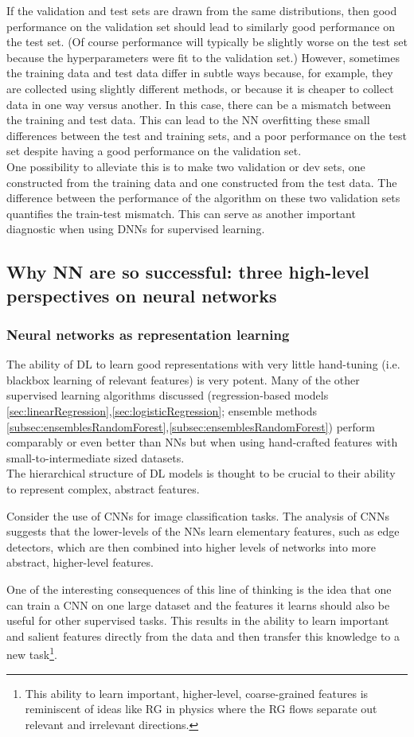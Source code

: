 If the validation and test sets are drawn from the same distributions, then good performance on the validation set should lead to similarly good performance on the test set. (Of course performance will typically be slightly worse on the test set because the hyperparameters were fit to the validation set.) However, sometimes the training data and test data differ in subtle ways because, for example, they are collected using slightly different methods, or because it is cheaper to collect data in one way versus another. In this case, there can be a mismatch between the training and test data. This can lead to the NN overfitting these small differences between the test and training sets, and a poor performance on the test set despite having a good performance on the validation set.
\\
One possibility to alleviate this is to make two validation or dev sets, one constructed from the training data and one constructed from the test data. The difference between the performance of the algorithm on these two validation sets quantifies the train-test mismatch. This can serve as another important diagnostic when using DNNs for supervised learning.

\subsection{Why NN are so successful: three high-level perspectives on neural networks}
\label{subsec:dnn2Successful}
\subsubsection{Neural networks as representation learning}
\label{subsubsec:dnn2SuccessfulRepresentation}
The ability of DL to learn good representations with very little hand-tuning (i.e. blackbox learning of relevant features) is very potent. Many of the other supervised learning algorithms discussed (regression-based models \ref{sec:linearRegression},\ref{sec:logisticRegression}; ensemble methods \ref{subsec:ensemblesRandomForest},\ref{subsec:ensemblesRandomForest}) perform comparably or even better than NNs but when using hand-crafted features with small-to-intermediate sized datasets.\\
The hierarchical structure of DL models is thought to be crucial to their ability to represent complex, abstract features.
\begin{example}
	Consider the use of CNNs for image classification tasks. The analysis of CNNs suggests that the lower-levels of the NNs learn elementary features, such as edge detectors, which are then combined into higher levels of networks into more abstract, higher-level features.
\end{example}
One of the interesting consequences of this line of thinking is the idea that one can train a CNN on one large dataset and the features it learns should also be useful for other supervised tasks. This results in the ability to learn important and salient features directly from the data and then transfer this knowledge to a new task\footnote{This ability to learn important, higher-level, coarse-grained features is reminiscent of ideas like RG in physics where the RG flows separate out relevant and irrelevant directions.}.

